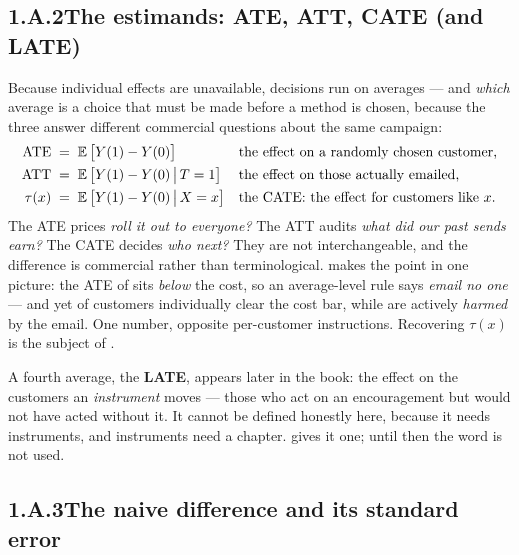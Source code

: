 \subsection*{1.A.2\quad The estimands: ATE, ATT, CATE (and LATE)}

Because individual effects are unavailable, decisions run on averages --- and \emph{which}
average is a choice that must be made before a method is chosen, because the three answer
different commercial questions about the same campaign:
%
\begin{align}
  \text{ATE} &\;=\; \operatorname{\mathbb{E}}\big[Y(1) - Y(0)\big]
     &&\text{the effect on a randomly chosen customer,} \label{eq:fnd:ate}\\
  \text{ATT} &\;=\; \operatorname{\mathbb{E}}\big[Y(1) - Y(0) \,\big|\, T = 1\big]
     &&\text{the effect on those actually emailed,} \label{eq:fnd:att}\\
  \tau(x) &\;=\; \operatorname{\mathbb{E}}\big[Y(1) - Y(0) \,\big|\, X = x\big]
     &&\text{the CATE: the effect for customers like } x. \label{eq:fnd:cate}
\end{align}
%
The ATE prices \emph{roll it out to everyone?} The ATT audits \emph{what did our past sends
earn?} The CATE decides \emph{who next?} They are not interchangeable, and the difference is
commercial rather than terminological.  makes the point in one picture: the ATE
of \eur{\nbZeroTrueAte} sits \emph{below} the \eur{\nbZeroCost} cost, so an average-level rule
says \emph{email no one} --- and yet \pc{\nbZeroShareAboveCost} of customers individually clear
the cost bar, while \pc{\nbZeroShareNegative} are actively \emph{harmed} by the email. One
number, opposite per-customer instructions. Recovering $\tau(x)$ is the subject of .

A fourth average, the \textbf{LATE}, appears later in the book: the effect on the customers an
\emph{instrument} moves --- those who act on an encouragement but would not have acted without
it. It cannot be defined honestly here, because it needs instruments, and instruments need a
chapter.  gives it one; until then the word is not used.

\subsection*{1.A.3\quad The naive difference and its standard error}

